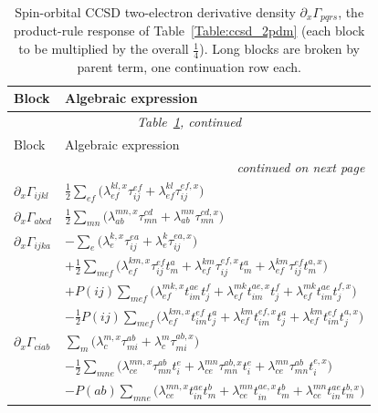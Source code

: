 \documentclass[12pt]{article}
\begin{document}
{\renewcommand{\arraystretch}{1.5}\setlength{\LTcapwidth}{\textwidth}
\begin{longtable}{ll}
\caption{Spin-orbital CCSD two-electron derivative density
$\partial_x\Gamma_{pqrs}$, the product-rule response of
Table~\ref{Table:ccsd_2pdm} (each block to be multiplied by the overall
$\frac14$).  Long blocks are broken by parent term, one continuation row each.}
\label{Table:ccsd_deriv_2pdm}\\
\hline\hline
Block & Algebraic expression \\
\hline
\endfirsthead
\multicolumn{2}{c}{\small\emph{Table~\ref{Table:ccsd_deriv_2pdm}, continued}}\\
\hline\hline
Block & Algebraic expression \\
\hline
\endhead
\hline
\multicolumn{2}{r}{\small\emph{continued on next page}}\\
\endfoot
\hline\hline
\endlastfoot
$\partial_x\Gamma_{ijkl}$ & $\displaystyle \frac12\sum_{ef}\big(\lambda^{kl,x}_{ef}\tau^{ef}_{ij} + \lambda^{kl}_{ef}\tau^{ef,x}_{ij}\big)$ \\
$\partial_x\Gamma_{abcd}$ & $\displaystyle \frac12\sum_{mn}\big(\lambda^{mn,x}_{ab}\tau^{cd}_{mn} + \lambda^{mn}_{ab}\tau^{cd,x}_{mn}\big)$ \\
$\partial_x\Gamma_{ijka}$ & $\displaystyle -\sum_e\big(\lambda^{k,x}_e\tau^{ea}_{ij} + \lambda^k_e\tau^{ea,x}_{ij}\big)$ \\
 & $\displaystyle + \frac12\sum_{mef}\big(\lambda^{km,x}_{ef}\tau^{ef}_{ij}t^a_m + \lambda^{km}_{ef}\tau^{ef,x}_{ij}t^a_m + \lambda^{km}_{ef}\tau^{ef}_{ij}t^{a,x}_m\big)$ \\
 & $\displaystyle + P(ij)\sum_{mef}\big(\lambda^{mk,x}_{ef}t^{ae}_{im}t^f_j + \lambda^{mk}_{ef}t^{ae,x}_{im}t^f_j + \lambda^{mk}_{ef}t^{ae}_{im}t^{f,x}_j\big)$ \\
 & $\displaystyle - \frac12 P(ij)\sum_{mef}\big(\lambda^{km,x}_{ef}t^{ef}_{im}t^a_j + \lambda^{km}_{ef}t^{ef,x}_{im}t^a_j + \lambda^{km}_{ef}t^{ef}_{im}t^{a,x}_j\big)$ \\
$\partial_x\Gamma_{ciab}$ & $\displaystyle \sum_m\big(\lambda^{m,x}_c\tau^{ab}_{mi} + \lambda^m_c\tau^{ab,x}_{mi}\big)$ \\
 & $\displaystyle - \frac12\sum_{mne}\big(\lambda^{mn,x}_{ce}\tau^{ab}_{mn}t^e_i + \lambda^{mn}_{ce}\tau^{ab,x}_{mn}t^e_i + \lambda^{mn}_{ce}\tau^{ab}_{mn}t^{e,x}_i\big)$ \\
 & $\displaystyle - P(ab)\sum_{mne}\big(\lambda^{mn,x}_{ce}t^{ae}_{in}t^b_m + \lambda^{mn}_{ce}t^{ae,x}_{in}t^b_m + \lambda^{mn}_{ce}t^{ae}_{in}t^{b,x}_m\big)$ \\

\end{longtable}}
\end{document}
